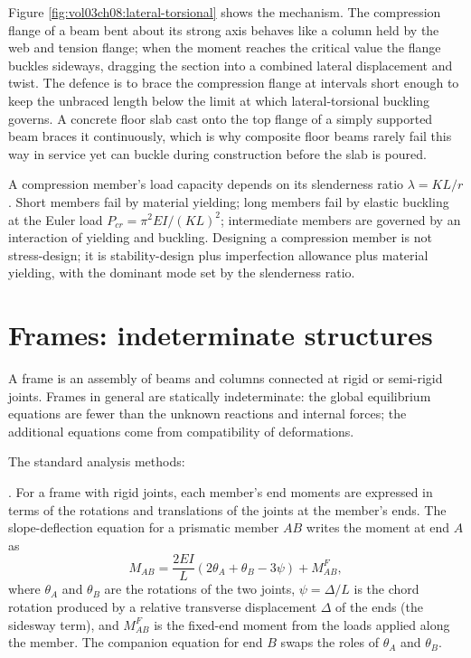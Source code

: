 

Figure \ref{fig:vol03ch08:lateral-torsional} shows the mechanism. The
compression flange of a beam bent about its strong axis behaves like a
column held by the web and tension flange; when the moment reaches the
critical value the flange buckles sideways, dragging the section into a
combined lateral displacement and twist. The defence is to brace the
compression flange at intervals short enough to keep the unbraced
length below the limit at which lateral-torsional buckling governs. A
concrete floor slab cast onto the top flange of a simply supported beam
braces it continuously, which is why composite floor beams rarely fail
this way in service yet can buckle during construction before the slab
is poured.

\begin{principle}
A compression member's load capacity depends on its slenderness
ratio $\lambda = KL/r$. Short members fail by material yielding;
long members fail by elastic buckling at the Euler load $P_{cr}
= \pi^2 EI/(KL)^2$; intermediate members are governed by an
interaction of yielding and buckling. Designing a compression
member is not stress-design; it is stability-design plus
imperfection allowance plus material yielding, with the dominant
mode set by the slenderness ratio.
\end{principle}

\section{Frames: indeterminate structures}

A frame is an assembly of beams and columns connected at rigid or
semi-rigid joints. Frames in general are statically indeterminate:
the global equilibrium equations are fewer than the unknown
reactions and internal forces; the additional equations come from
compatibility of deformations.

The standard analysis methods:

. For a frame with rigid joints,
each member's end moments are expressed in terms of the rotations
and translations of the joints at the member's ends. The
slope-deflection equation for a prismatic member $AB$ writes the moment
at end $A$ as
\[
M_{AB} = \frac{2EI}{L}\left(2\theta_A + \theta_B - 3\psi\right)
+ M^{F}_{AB},
\]
where $\theta_A$ and $\theta_B$ are the rotations of the two joints,
$\psi = \Delta/L$ is the chord rotation produced by a relative
transverse displacement $\Delta$ of the ends (the sidesway term), and
$M^{F}_{AB}$ is the fixed-end moment from the loads applied along the
member. The companion equation for end $B$ swaps the roles of $\theta_A$
and $\theta_B$.

